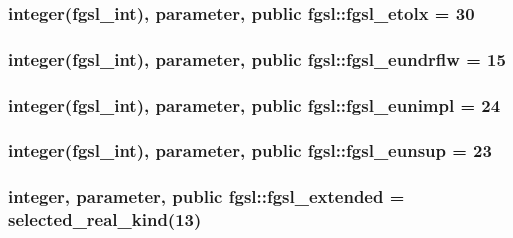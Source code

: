 \hypertarget{classfgsl_ad136d96d34c4ac68f155224650a94e4c}{
\subsubsection[{fgsl\-\_\-etolx}]{\setlength{\rightskip}{0pt plus 5cm}integer({\bf fgsl\-\_\-int}), parameter, public fgsl\-::fgsl\-\_\-etolx = 30}}\label{classfgsl_ad136d96d34c4ac68f155224650a94e4c}
\hypertarget{classfgsl_ae5ac5a32777e537541e47cb0419da46c}{
\subsubsection[{fgsl\-\_\-eundrflw}]{\setlength{\rightskip}{0pt plus 5cm}integer({\bf fgsl\-\_\-int}), parameter, public fgsl\-::fgsl\-\_\-eundrflw = 15}}\label{classfgsl_ae5ac5a32777e537541e47cb0419da46c}
\hypertarget{classfgsl_a3a2e9a31e7f3fc209b5269b82d17117c}{
\subsubsection[{fgsl\-\_\-eunimpl}]{\setlength{\rightskip}{0pt plus 5cm}integer({\bf fgsl\-\_\-int}), parameter, public fgsl\-::fgsl\-\_\-eunimpl = 24}}\label{classfgsl_a3a2e9a31e7f3fc209b5269b82d17117c}
\hypertarget{classfgsl_af76528fed48ac5623d664d6e66e7ac1b}{
\subsubsection[{fgsl\-\_\-eunsup}]{\setlength{\rightskip}{0pt plus 5cm}integer({\bf fgsl\-\_\-int}), parameter, public fgsl\-::fgsl\-\_\-eunsup = 23}}\label{classfgsl_af76528fed48ac5623d664d6e66e7ac1b}
\hypertarget{classfgsl_a9f38abe97062020e8a507aaa5bc683ab}{
\subsubsection[{fgsl\-\_\-extended}]{\setlength{\rightskip}{0pt plus 5cm}integer, parameter, public fgsl\-::fgsl\-\_\-extended = selected\-\_\-real\-\_\-kind(13)}}\label{classfgsl_a9f38abe97062020e8a507aaa5bc683ab}
